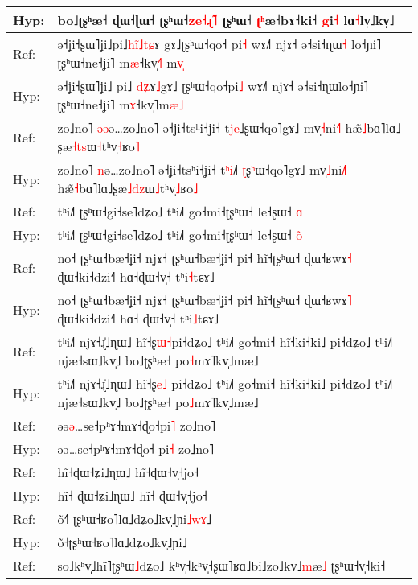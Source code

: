 \documentclass[10pt]{article}
\DeclareRobustCommand{\hl}[1]{{\textcolor{red}{#1}}}
\begin{document}
\begin{longtable}{ll}
Hyp: & bo˩ʈʂʰæ˧\hl{ }ɖɯ˧ɭɯ˧ ʈʂʰɯ˧\hl{z}\hl{e}\hl{˧}\hl{ɻ}\hl{̃}\hl{˥}\hl{ }ʈʂʰɯ˧ \hl{ʈ}\hl{ʰ}æ˧bɤ˧ki˧\hl{ }\hl{g}i\hl{˧}\hl{ }lɑ\hl{˧}lv̩˩kv̩˩ \\ 
\midrule 
Ref: & ə˧ʝi˧ʂɯ˥ʝi˩pi˩\hl{h}\hl{i}\hl{̃}\hl{˩}\hl{t}\hl{ɕ}ɤ\hl{ }gɤ˩ʈʂʰɯ˧qo˧\hl{ }pi\hl{˧} wɤ˩˥ njɤ˧ ə˧si˧ɳɯ\hl{˧}\hl{ }lo˧ɲi˥ ʈʂʰɯ˧ne˧ʝi˥ m\hl{æ}˧kv̩\hl{˧}˥\hl{ }m\hl{v}\hl{̩} \\ 
Hyp: & ə˧ʝi˧ʂɯ˥ʝi˩\hl{ }pi˩\hl{ }\hl{d}\hl{ʑ}ɤ\hl{˩}gɤ˩\hl{ }ʈʂʰɯ˧qo˧pi\hl{˩} wɤ˩˥ njɤ˧ ə˧si˧ɳɯlo˧ɲi˥ ʈʂʰɯ˧ne˧ʝi˥ m\hl{ɤ}˧kv̩˥m\hl{æ}\hl{˩} \\ 
\midrule 
Ref: & zo˩no˥ \hl{ə}\hl{ə}ə…zo˩no˥ ə˧ʝi˧tsʰi˧ʝi˧ t\hl{j}\hl{e}˩ʂɯ˧qo˥gɤ˩ mv̩\hl{˧}ni\hl{˧}˥ hæ̃\hl{˩}bɑ˥lɑ˩\hl{ }ʂæ\hl{˧}\hl{t}\hl{s}ɯ\hl{˧}tʰv̩\hl{˧}ʁo\hl{˥} \\ 
Hyp: & zo˩no˥ \hl{n}ə…zo˩no˥ ə˧ʝi˧tsʰi˧ʝi˧ t\hl{ʰ}\hl{i}˩\hl{˥}\hl{ }\hl{ʈ}ʂ\hl{ʰ}ɯ˧qo˥gɤ˩ mv̩\hl{˩}ni\hl{˩}˥ hæ̃\hl{˧}bɑ˥lɑ˩ʂæ\hl{˩}\hl{d}\hl{z}ɯ\hl{˩}tʰv̩\hl{˩}ʁo\hl{˩} \\ 
\midrule 
Ref: & tʰi˩˥ ʈʂʰɯ˧gi˧se˥dʑo˩ tʰi˩˥ go˧mi˧ʈʂʰɯ˧ le˧ʂɯ˧ \hl{ɑ} \\ 
Hyp: & tʰi˩˥ ʈʂʰɯ˧gi˧se˥dʑo˩ tʰi˩˥ go˧mi˧ʈʂʰɯ˧ le˧ʂɯ˧ \hl{o}\hl{̃} \\ 
\midrule 
Ref: & no˧ ʈʂʰɯ˧bæ˧ʝi˧ njɤ˧ ʈʂʰɯ˧bæ˧ʝi˧ pi˧ hĩ˧ʈʂʰɯ˧ ɖɯ˧ʁwɤ\hl{˧} ɖɯ˧ki˧dzi˧˥ hɑ˧ɖɯ˧v̩˧ tʰi\hl{˧}tɕɤ˩ \\ 
Hyp: & no˧ ʈʂʰɯ˧bæ˧ʝi˧ njɤ˧ ʈʂʰɯ˧bæ˧ʝi˧ pi˧ hĩ˧ʈʂʰɯ˧ ɖɯ˧ʁwɤ\hl{˥} ɖɯ˧ki˧dzi˧˥ hɑ˧\hl{ }ɖɯ˧v̩˧ tʰi\hl{˩}tɕɤ˩ \\ 
\midrule 
Ref: & tʰi˩˥ njɤ˧ɻ̍˩ɳɯ˩ hĩ˧ʂ\hl{ɯ}\hl{˧}pi˧dʑo˩ tʰi˩˥ go˧mi˧ hĩ˧ki˧ki˩ pi˧dʑo˩ tʰi˩˥ njæ˧sɯ˩kv̩˩ bo˩ʈʂʰæ˧ po\hl{˧}mɤ˥kv̩˩mæ˩ \\ 
Hyp: & tʰi˩˥ njɤ˧ɻ̍˩ɳɯ˩ hĩ˧ʂ\hl{e}\hl{˩}\hl{ }pi˧dʑo˩ tʰi˩˥ go˧mi˧ hĩ˧ki˧ki˩ pi˧dʑo˩ tʰi˩˥ njæ˧sɯ˩kv̩˩ bo˩ʈʂʰæ˧ po\hl{˩}mɤ˥kv̩˩mæ˩ \\ 
\midrule 
Ref: & əə\hl{ə}…se˧pʰɤ˧mɤ˧ɖo˧pi\hl{˥} zo˩no˥ \\ 
Hyp: & əə…se˧pʰɤ˧mɤ˧ɖo˧\hl{ }pi\hl{˧} zo˩no˥ \\ 
\midrule 
Ref: & hĩ˧ɖɯ˧ʑi˩ɳɯ˩ hĩ˧ɖɯ˧v̩˧jo˧ \\ 
Hyp: & hĩ˧\hl{ }ɖɯ˧ʑi˩ɳɯ˩ hĩ˧\hl{ }ɖɯ˧v̩˧jo˧ \\ 
\midrule 
Ref: & õ˧\hl{˥}\hl{ }ʈʂʰɯ˧ʁo˥lɑ˩dʑo˩kv̩˩ɲi\hl{˩}\hl{w}\hl{ɤ}˩ \\ 
Hyp: & õ˧ʈʂʰɯ˧ʁo˥lɑ˩dʑo˩kv̩˩ɲi˩ \\ 
\midrule 
Ref: & so˩kʰv̩˩hĩ˥ʈʂʰɯ\hl{˩}dʑo˩ kʰv̩˧kʰv̩˧ʂɯ˥ʁɑ˩bi˩zo˩kv̩˩\hl{m}æ\hl{˩} ʈʂʰɯ˧v̩˧ki˧ \\ 

\end{longtable}
\end{document}
